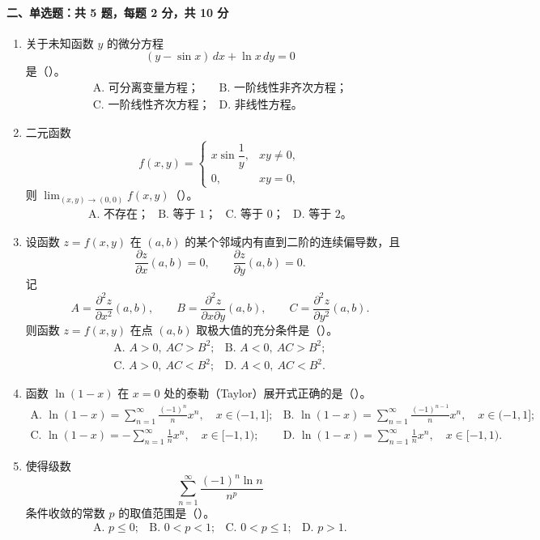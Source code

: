 \paragraph*{二、单选题：共 5 题，每题 2 分，共 10 分}
\begin{enumerate}
  \item 关于未知函数 $y$ 的微分方程
  \[
    (y-\sin x)\,dx+\ln x\,dy=0
  \]
  是（\quad）。
  \[
  \begin{array}{ll}
    \text{A. 可分离变量方程；} & \text{B. 一阶线性非齐次方程；}\\
    \text{C. 一阶线性齐次方程；} & \text{D. 非线性方程。}
  \end{array}
  \]

  \item 二元函数
  \[
    f(x,y)=
    \begin{cases}
      x\sin\dfrac{1}{y}, & xy\ne 0,\\
      0, & xy=0,
    \end{cases}
  \]
  则 $\displaystyle \lim_{(x,y)\to(0,0)}f(x,y)$（\quad）。
  \[
  \begin{array}{llll}
    \text{A. 不存在；} & \text{B. 等于 1；} &
    \text{C. 等于 0；} & \text{D. 等于 2。}
  \end{array}
  \]

  \item 设函数 $z=f(x,y)$ 在 $(a,b)$ 的某个邻域内有直到二阶的连续偏导数，且
  \[
    \frac{\partial z}{\partial x}(a,b)=0,\qquad
    \frac{\partial z}{\partial y}(a,b)=0.
  \]
  记
  \[
    A=\frac{\partial^2 z}{\partial x^2}(a,b),\qquad
    B=\frac{\partial^2 z}{\partial x\partial y}(a,b),\qquad
    C=\frac{\partial^2 z}{\partial y^2}(a,b).
  \]
  则函数 $z=f(x,y)$ 在点 $(a,b)$ 取极大值的充分条件是（\quad）。
  \[
  \begin{array}{ll}
    \text{A. } A>0,\ AC>B^2; & \text{B. } A<0,\ AC>B^2;\\
    \text{C. } A>0,\ AC<B^2; & \text{D. } A<0,\ AC<B^2.
  \end{array}
  \]

  \item 函数 $\ln(1-x)$ 在 $x=0$ 处的泰勒（Taylor）展开式正确的是（\quad）。
  \[
  \begin{array}{ll}
    \text{A. } \displaystyle \ln(1-x)=\sum_{n=1}^{\infty}\frac{(-1)^n}{n}x^n,\quad x\in(-1,1];&
    \text{B. } \displaystyle \ln(1-x)=\sum_{n=1}^{\infty}\frac{(-1)^{n-1}}{n}x^n,\quad x\in(-1,1];\\[1.2em]
    \text{C. } \displaystyle \ln(1-x)=-\sum_{n=1}^{\infty}\frac{1}{n}x^n,\quad x\in[-1,1);&
    \text{D. } \displaystyle \ln(1-x)=\sum_{n=1}^{\infty}\frac{1}{n}x^n,\quad x\in[-1,1).
  \end{array}
  \]

  \item 使得级数
  \[
    \sum_{n=1}^{\infty}\frac{(-1)^n\ln n}{n^p}
  \]
  条件收敛的常数 $p$ 的取值范围是（\quad）。
  \[
  \begin{array}{llll}
    \text{A. }p\le 0; & \text{B. }0<p<1; &
    \text{C. }0<p\le 1; & \text{D. }p>1.
  \end{array}
  \]
\end{enumerate}

